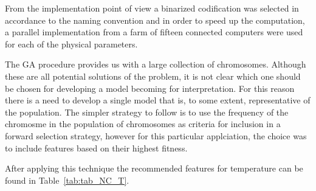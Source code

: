{{From the implementation point of view a binarized codification was selected in accordance to the naming convention
and in order to speed up the computation, a parallel implementation from a farm of fifteen connected computers were used
for each of the physical parameters.
}


{
The GA procedure provides us with a large collection of chromosomes.
Although these are all potential solutions of the problem, it is not clear which one
should be chosen for developing a model becoming for interpretation. 
For this reason there is a need to
develop a single model that is, to some extent, representative of the
population. The simpler strategy to follow is to use the frequency of the chromosme in
the population of chromosomes as criteria for inclusion in a forward selection
strategy, however for this particular applciation, the choice was to include features based on their highest fitness.

After applying this technique the recommended features for temperature 
can be found in Table~\ref{tab:tab_NC_T}. 

}}
